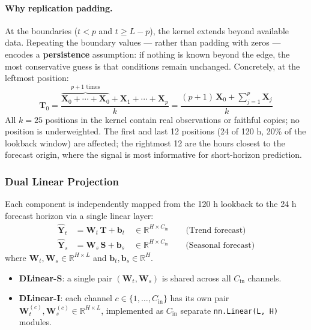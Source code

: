 \paragraph{Why replication padding.}
At the boundaries ($t < p$ and $t \ge L-p$), the kernel extends beyond available
data. Repeating the boundary values --- rather than padding with zeros ---
encodes a \textbf{persistence} assumption: if nothing is known beyond the edge,
the most conservative guess is that conditions remain unchanged. Concretely, at
the leftmost position:
%
\begin{equation}
\mathbf{T}_0 = \frac{\overbrace{\mathbf{X}_0 + \cdots + \mathbf{X}_0}^{p+1 \text{ times}}
        + \mathbf{X}_1 + \cdots + \mathbf{X}_p}{k}
        = \frac{(p+1)\,\mathbf{X}_0 + \sum_{j=1}^{p} \mathbf{X}_j}{k}
\end{equation}
%
All $k=25$ positions in the kernel contain real observations or faithful copies;
no position is underweighted. The first and last 12 positions (24 of 120 h, 20\%
of the lookback window) are affected; the rightmost 12 are the hours closest to
the forecast origin, where the signal is most informative for short-horizon
prediction.

\subsubsection{Dual Linear Projection}

Each component is independently mapped from the 120 h lookback to the 24 h
forecast horizon via a single linear layer:
%
\begin{align}
\mathbf{\hat{Y}}_t &= \mathbf{W}_t \, \mathbf{T} + \mathbf{b}_t
        \quad \in \mathbb{R}^{H \times C_{\text{in}}}
        \qquad \text{(Trend forecast)} \\
\mathbf{\hat{Y}}_s &= \mathbf{W}_s \, \mathbf{S} + \mathbf{b}_s
        \quad \in \mathbb{R}^{H \times C_{\text{in}}}
        \qquad \text{(Seasonal forecast)}
\end{align}
%
where $\mathbf{W}_t, \mathbf{W}_s \in \mathbb{R}^{H \times L}$ and
$\mathbf{b}_t, \mathbf{b}_s \in \mathbb{R}^{H}$.

\begin{itemize}
  \item \textbf{DLinear-S}: a single pair $(\mathbf{W}_t, \mathbf{W}_s)$ is
        shared across all $C_{\text{in}}$ channels.
  \item \textbf{DLinear-I}: each channel $c \in \{1, \ldots, C_{\text{in}}\}$
        has its own pair $\mathbf{W}_t^{(c)}, \mathbf{W}_s^{(c)} \in
        \mathbb{R}^{H \times L}$, implemented as $C_{\text{in}}$ separate
        \texttt{nn.Linear(L, H)} modules.
\end{itemize}

